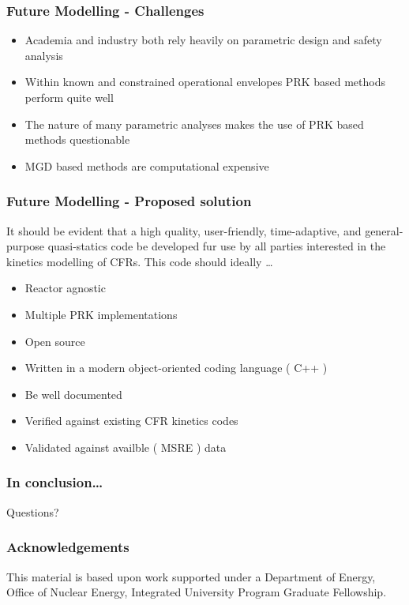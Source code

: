 \documentclass{beamer}
\begin{document}
\begin{frame}
\frametitle{Future Modelling  - Challenges}
    
    \begin{itemize}
        \item Academia and industry both rely heavily on parametric design and
            safety analysis
        \item Within known and constrained operational envelopes PRK based
            methods perform quite well
        \item The nature of many parametric analyses makes the use of PRK based
            methods questionable
        \item MGD based methods are computational expensive
    \end{itemize}

\end{frame}

\begin{frame}
\frametitle{Future Modelling  - Proposed solution}
    
    It should be evident that a high quality, user-friendly, time-adaptive, and
    general-purpose quasi-statics code be developed fur use by all parties
    interested in the kinetics modelling of CFRs. This code should ideally
    \ldots

    \begin{itemize}
        \item Reactor agnostic
        \item Multiple PRK implementations
        \item Open source
        \item Written in a modern object-oriented coding language ( C++ )
        \item Be well documented
        \item Verified against existing CFR kinetics codes
        \item Validated against availble ( MSRE ) data
    \end{itemize}

\end{frame}

\begin{frame}
\frametitle{In conclusion\ldots}

    Questions?

\end{frame}

\begin{frame}
\frametitle{Acknowledgements}

    This material is based upon work supported under a Department of Energy,
    Office of Nuclear Energy, Integrated University Program Graduate Fellowship.

\end{frame}
\end{document}
